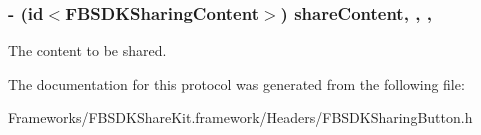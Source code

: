\subsubsection[{share\+Content}]{\setlength{\rightskip}{0pt plus 5cm}-\/ (id$<${\bf F\+B\+S\+D\+K\+Sharing\+Content}$>$) share\+Content\hspace{0.3cm}{\ttfamily [read]}, {\ttfamily [write]}, {\ttfamily [nonatomic]}, {\ttfamily [copy]}}\label{protocol_f_b_s_d_k_sharing_button-p_a065e0c554fc3c324e3c065ed46c1c6cb}
The content to be shared. 

The documentation for this protocol was generated from the following file\+:\begin{DoxyCompactItemize}
\item 
Frameworks/\+F\+B\+S\+D\+K\+Share\+Kit.\+framework/\+Headers/F\+B\+S\+D\+K\+Sharing\+Button.\+h\end{DoxyCompactItemize}
